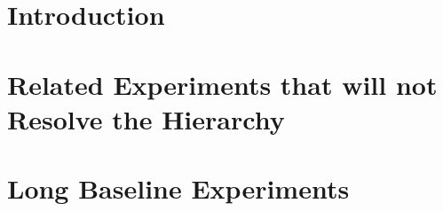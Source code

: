 \documentclass[12pt,letterpaper,amsmath,amssymb,final]{article}
\begin{document}
\newpage
\section{Introduction}\label{s:intro}



\section{Related Experiments that will not Resolve the Hierarchy}\label{s:not}




%

%

%

%

%


\section{Long Baseline Experiments}\label{s:lb}
\end{document}
